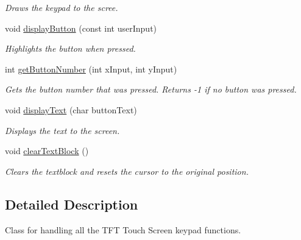 \begin{DoxyCompactItemize}
\begin{DoxyCompactList}\small\item\em Draws the keypad to the scree. \end{DoxyCompactList}\item 
void \hyperlink{class_touch_screen_keypad_ae7626db736c68860f729e2b19717df9b}{display\+Button} (const int user\+Input)
\begin{DoxyCompactList}\small\item\em Highlights the button when pressed. \end{DoxyCompactList}\item 
int \hyperlink{class_touch_screen_keypad_ac9137abd620f43f4da11f7c17b124a68}{get\+Button\+Number} (int x\+Input, int y\+Input)
\begin{DoxyCompactList}\small\item\em Gets the button number that was pressed. Returns -\/1 if no button was pressed. \end{DoxyCompactList}\item 
void \hyperlink{class_touch_screen_keypad_af5e2d766c059dd50677f834980836bae}{display\+Text} (char button\+Text)
\begin{DoxyCompactList}\small\item\em Displays the text to the screen. \end{DoxyCompactList}\item 
\hypertarget{class_touch_screen_keypad_ac917770c7b791c5d5277eb65e15ed785}{void \hyperlink{class_touch_screen_keypad_ac917770c7b791c5d5277eb65e15ed785}{clear\+Text\+Block} ()}\label{class_touch_screen_keypad_ac917770c7b791c5d5277eb65e15ed785}

\begin{DoxyCompactList}\small\item\em Clears the textblock and resets the cursor to the original position. \end{DoxyCompactList}\end{DoxyCompactItemize}


\subsection{Detailed Description}
Class for handling all the T\+F\+T Touch Screen keypad functions. 

